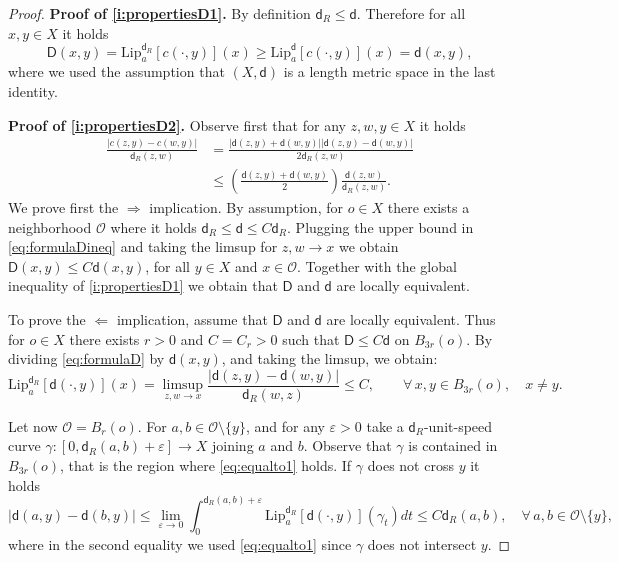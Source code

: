 \documentclass[11pt,a4paper]{article}
\theoremstyle{plain}
\theoremstyle{definition}
\theoremstyle{remark}
\numberwithin{equation}{section}
\newcommand{\sfd}{\mathsf d}
\newcommand{\sfD}{\mathsf D}
\begin{document}
\begin{proof}
\textbf{Proof of \ref{i:propertiesD1}.} By definition $\sfd_R \leq \sfd$. Therefore for all $x,y\in X$ it holds
\begin{equation}
\sfD(x,y)=\mathrm{Lip}_a^{\sfd_R}[c(\cdot,y)](x)\geq  \mathrm{Lip}_a^{\sfd}[c(\cdot,y)](x) =  \sfd(x,y),
\end{equation}
where we used the assumption that $(X,\sfd)$ is a length metric space in the last identity.

\textbf{Proof of \ref{i:propertiesD2}.} Observe first that for any $z,w,y\in X$ it holds
\begin{align}
\frac{|c(z,y)-c(w,y)|}{\sfd_R(z,w)} & = \frac{|\sfd(z,y)+\sfd(w,y)||\sfd(z,y)-\sfd(w,y)|}{2 \sfd_R(z,w)} \label{eq:formulaD} \\
& \leq \left(\frac{\sfd(z,y)+\sfd(w,y)}{2}\right) \frac{\sfd(z,w)}{\sfd_R(z,w)}. \label{eq:formulaDineq}
\end{align}
We prove first the $\Rightarrow$ implication. By assumption, for $o\in X$ there exists a neighborhood $\mathcal{O}$ where it holds $\sfd_R \leq \sfd \leq C \sfd_R$. Plugging the upper bound in \eqref{eq:formulaDineq} and taking the limsup for $z,w\to x$ we obtain $\sfD(x,y)\leq C \sfd(x,y)$, for all $y\in X$ and $x\in \mathcal{O}$. Together with the global inequality of \ref{i:propertiesD1} we obtain that $\sfD$ and $\sfd$ are locally equivalent.

To prove the $\Leftarrow$ implication, assume that $\sfD$ and $\sfd$ are locally equivalent. Thus for $o\in X$ there exists $r>0$ and $C=C_r>0$ such that $\sfD \leq C \sfd$ on $B_{3r}(o)$.  By dividing \eqref{eq:formulaD} by $\sfd(x,y)$, and taking the limsup, we obtain:
\begin{equation}\label{eq:equalto1}
\mathrm{Lip}_a^{\sfd_R}[\sfd(\cdot,y)](x)=\limsup_{z,w\to x} \frac{|\sfd(z,y)-\sfd(w,y)|}{\sfd_R(w,z)} \leq  C, \qquad \forall\, x,y\in B_{3r}(o),\quad x\neq y.
\end{equation}

Let now $\mathcal{O} = B_r(o)$. For $a,b\in \mathcal{O}\setminus \{y\}$, and for any $\varepsilon>0$ take a $\sfd_R$-unit-speed curve $\gamma:[0,\sfd_R(a,b)+\varepsilon]\to X$ joining $a$ and $b$. Observe that $\gamma$ is contained in $B_{3r}(o)$, that is the region where \eqref{eq:equalto1} holds. If $\gamma$ does not cross $y$ it holds
\begin{equation}
|\sfd(a,y)-\sfd(b,y)| \leq \lim_{\varepsilon\to 0} \int_0^{\sfd_R(a,b)+\varepsilon} \mathrm{Lip}_a^{\sfd_R}[\sfd(\cdot,y)](\gamma_t)dt \leq C \sfd_R(a,b), \quad \forall\, a,b\in \mathcal{O}\setminus \{y\},
\end{equation}
where in the second equality we used \eqref{eq:equalto1} since $\gamma$ does not intersect $y$. 


\end{proof}
\end{document}
